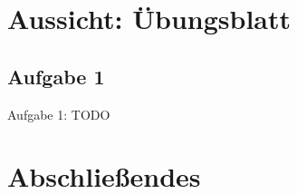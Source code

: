 \iffull
{}
\section[Aussicht: Übungsblatt \T{Integer.MAX\_VALUE}]{Aussicht: Übungsblatt \textbf{}}
\subsection{Aufgabe 1}
\begin{frame}{Aufgabe 1: TODO}

\end{frame}
\fi

\section{Abschließendes}

